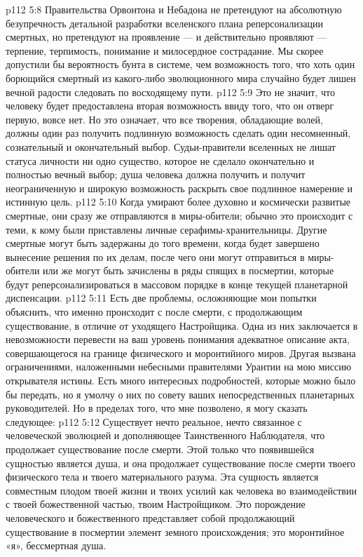 \vs p112 5:8 Правительства Орвонтона и Небадона не претендуют на абсолютную безупречность детальной разработки вселенского плана реперсонализации смертных, но претендуют на проявление --- и действительно проявляют --- терпение, терпимость, понимание и милосердное сострадание. Мы скорее допустили бы вероятность бунта в системе, чем возможность того, что хоть один борющийся смертный из какого\hyp{}либо эволюционного мира случайно будет лишен вечной радости следовать по восходящему пути.
\vs p112 5:9 Это не значит, что человеку будет предоставлена вторая возможность ввиду того, что он отверг первую, вовсе нет. Но это означает, что все творения, обладающие волей, должны один раз получить подлинную возможность сделать один несомненный, сознательный и окончательный выбор. Судьи\hyp{}правители вселенных не лишат статуса личности ни одно существо, которое не сделало окончательно и полностью вечный выбор; душа человека должна получить и получит неограниченную и широкую возможность раскрыть свое подлинное намерение и истинную цель.
\vs p112 5:10 Когда умирают более духовно и космически развитые смертные, они сразу же отправляются в миры\hyp{}обители; обычно это происходит с теми, к кому были приставлены личные серафимы\hyp{}хранительницы. Другие смертные могут быть задержаны до того времени, когда будет завершено вынесение решения по их делам, после чего они могут отправиться в миры\hyp{}обители или же могут быть зачислены в ряды спящих в посмертии, которые будут реперсонализироваться в массовом порядке в конце текущей планетарной диспенсации.
\vs p112 5:11 \pc Есть две проблемы, осложняющие мои попытки объяснить, что именно происходит с  после смерти, с  продолжающим существование, в отличие от уходящего Настройщика. Одна из них заключается в невозможности перевести на ваш уровень понимания адекватное описание акта, совершающегося на границе физического и моронтийного миров. Другая вызвана ограничениями, наложенными небесными правителями Урантии на мою миссию открывателя истины. Есть много интересных подробностей, которые можно было бы передать, но я умолчу о них по совету ваших непосредственных планетарных руководителей. Но в пределах того, что мне позволено, я могу сказать следующее:
\vs p112 5:12 Существует нечто реальное, нечто связанное с человеческой эволюцией и дополняющее Таинственного Наблюдателя, что продолжает существование после смерти. Этой только что появившейся сущностью является душа, и она продолжает существование после смерти твоего физического тела и твоего материального разума. Эта сущность является совместным плодом твоей жизни и твоих усилий как человека во взаимодействии с твоей божественной частью, твоим Настройщиком. Это порождение человеческого и божественного представляет собой продолжающий существование в посмертии элемент земного происхождения; это моронтийное «я», бессмертная душа.

